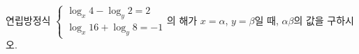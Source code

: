 연립방정식 $\begin{cases} \log_x 4-\log_y 2=2 \\ \log_x 16+\log_y 8=-1 \end{cases}$의 해가 $x=\alpha$, $y=\beta$일 때, $\alpha\beta$의 값을 구하시오.
